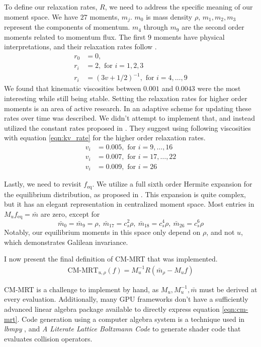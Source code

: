 To define our relaxation rates, $R$, we need to address
the specific meaning of our moment space.
We have $27$ moments, $m_j$.
$m_0$ is mass density $\rho$, 
$m_1, m_2, m_3$ represent the components of momentum.
$m_4$ through $m_9$ are the second order moments related
to momentum flux.
The first $9$ moments have physical interpretations,
and their relaxation rates follow \cite{Li2020, De2017}.
\begin{align}
  r_0 &= 0, \nonumber \\
  r_i &= 2, \text{ for } i = 1,2,3 \nonumber \\
  r_i &= (3v + 1 / 2)^{-1}, \text{ for } i = 4,\ldots, 9 \label{eqn:kv_rate}
\end{align}
We found that kinematic viscosities between 
$0.001$ and $0.0043$ were the most interesting while still being 
stable.
Setting the relaxation rates for higher order moments 
is an area of active research.
In \cite{Li2020} an adaptive scheme for updating these rates
over time was described.
We didn't attempt to implement that, 
and instead utilized the constant rates proposed in \cite{Li2018}.
They suggest using following viscosities
with equation \ref{eqn:kv_rate}
for the higher order relaxation rates. 
\begin{align*}
  v_i &= 0.005, \text{ for } i = 9,\ldots, 16 \\
  v_i &= 0.007, \text{ for } i = 17, \ldots, 22 \\
  v_i &= 0.009, \text{ for } i = 26 
\end{align*}

Lastly, we need to revisit $f_{\text{eq}}$.
We utilize a full sixth order Hermite expansion for 
the equilibrium distribution, as proposed in \cite{Shan2006}.
This expansion is quite complex, but it has an elegant
representation in centralized moment space.
Most entries in $M_u f_{\text{eq}} = \bar{m}$ are zero, 
except for
$$
\bar{m}_0 = \bar{m}_9 = \rho, \ 
\bar{m}_{17} = c_s^2 \rho, \ 
\bar{m}_{18} = c_s^4\rho, \ 
\bar{m}_{26} = c_s^6 \rho
$$
Notably, our equilibrium moments in this space only depend on $\rho$,
and not $u$, which demonstrates Galilean invariance.

I now present the final definition of CM-MRT that was implemented.
\begin{align}
  \text{CM-MRT}_{u,\rho}(f) = M_u^{-1} R (\bar{m}_{\rho} - M_u f) \label{eqn:cm-mrt}
\end{align}

CM-MRT is a challenge to implement by hand, 
as $M_u, M_u^{-1}, \bar{m}$ must be derived at every evaluation.
Additionally, many GPU frameworks
don't have a sufficiently advanced linear algebra package available
to directly express equation \ref{eqn:cm-mrt}.
Code generation using a computer algebra system is a technique used 
in \textit{lbmpy} \cite{Hennig2023}, 
and \textit{A Literate Lattice Boltzmann Code}\cite{wev:literate_lbm}
to generate shader code that
evaluates collision operators.

